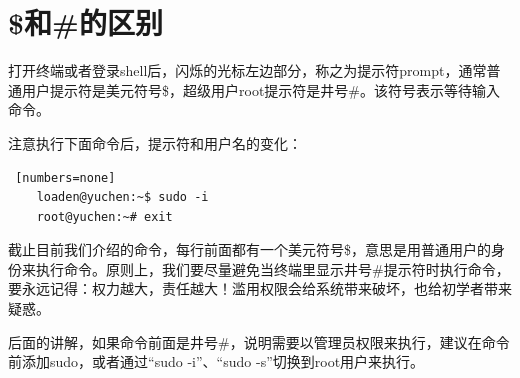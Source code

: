 \section{\$和\#的区别}

\par 打开终端或者登录shell后，闪烁的光标左边部分，称之为提示符prompt，通常普通用户提示符是美元符号\$，超级用户root提示符是井号\#。该符号表示等待输入命令。
\par 注意执行下面命令后，提示符和用户名的变化：

\begin{lstlisting} [numbers=none]
    loaden@yuchen:~$ sudo -i
    root@yuchen:~# exit
\end{lstlisting}

\par 截止目前我们介绍的命令，每行前面都有一个美元符号\$，意思是用普通用户的身份来执行命令。原则上，我们要尽量避免当终端里显示井号\#提示符时执行命令，要永远记得：权力越大，责任越大！滥用权限会给系统带来破坏，也给初学者带来疑惑。
\par 后面的讲解，如果命令前面是井号\#，说明需要以管理员权限来执行，建议在命令前添加sudo，或者通过“{sudo\hspace{0.3em} -i}”、“{sudo\hspace{0.3em} -s}”切换到root用户来执行。


\ifx\all\undefined

\fi
